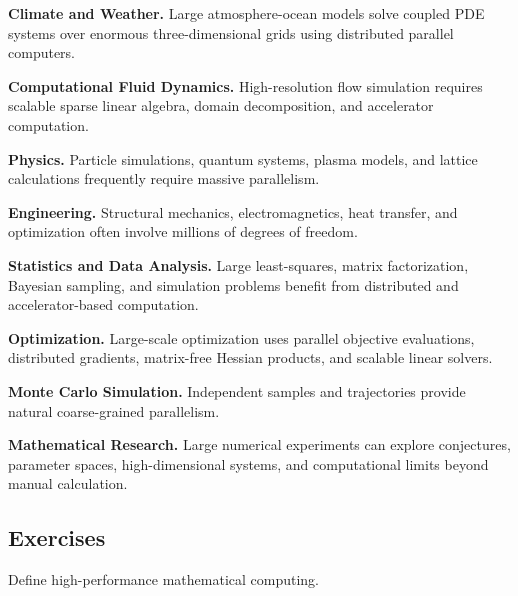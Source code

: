 \begin{applicationbox}

\textbf{Climate and Weather.}
Large atmosphere-ocean models solve coupled PDE systems over enormous
three-dimensional grids using distributed parallel computers.

\medskip

\textbf{Computational Fluid Dynamics.}
High-resolution flow simulation requires scalable sparse linear algebra,
domain decomposition, and accelerator computation.

\medskip

\textbf{Physics.}
Particle simulations, quantum systems, plasma models, and lattice
calculations frequently require massive parallelism.

\medskip

\textbf{Engineering.}
Structural mechanics, electromagnetics, heat transfer, and optimization
often involve millions of degrees of freedom.

\medskip

\textbf{Statistics and Data Analysis.}
Large least-squares, matrix factorization, Bayesian sampling, and
simulation problems benefit from distributed and accelerator-based
computation.

\medskip

\textbf{Optimization.}
Large-scale optimization uses parallel objective evaluations, distributed
gradients, matrix-free Hessian products, and scalable linear solvers.

\medskip

\textbf{Monte Carlo Simulation.}
Independent samples and trajectories provide natural coarse-grained
parallelism.

\medskip

\textbf{Mathematical Research.}
Large numerical experiments can explore conjectures, parameter spaces,
high-dimensional systems, and computational limits beyond manual
calculation.

\end{applicationbox}

\subsection{Exercises}
\label{subsec:hpmc-exercises}

\begin{exercise}[1]
Define high-performance mathematical computing.
\end{exercise}


